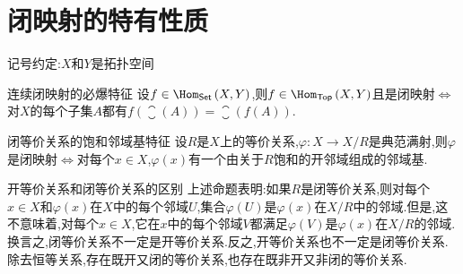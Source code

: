 \section{闭映射的特有性质}

记号约定:$X$和$Y$是拓扑空间

\begin{proposition}{连续闭映射的必爆特征}{}
	设$f\in\Hom_{\mathsf{Set}}\left(X,Y\right)$,则$f\in\Hom_{\mathsf{Top}}\left(X,Y\right)$且是闭映射$\iff$对$X$的每个子集$A$都有$f\left(\closure\left(A\right)\right)=\closure\left(f\left(A\right)\right)$.
\end{proposition}

\begin{proposition}{闭等价关系的饱和邻域基特征}{}
	设$R$是$X$上的等价关系,$\varphi:X\to X/R$是典范满射,则$\varphi$是闭映射$\iff$对每个$x\in X$,$\varphi\left(x\right)$有一个由关于$R$饱和的开邻域组成的邻域基.
\end{proposition}

\begin{remark}{开等价关系和闭等价关系的区别}{}
	上述命题表明:如果$R$是闭等价关系,则对每个$x\in X$和$\varphi\left(x\right)$在$X$中的每个邻域$U$,集合$\varphi\left(U\right)$是$\varphi\left(x\right)$在$X/R$中的邻域.但是,这不意味着,对每个$x\in X$,它在$x$中的每个邻域$V$都满足$\varphi\left(V\right)$是$\varphi\left(x\right)$在$X/R$的邻域.换言之,闭等价关系不一定是开等价关系.反之,开等价关系也不一定是闭等价关系.除去恒等关系,存在既开又闭的等价关系,也存在既非开又非闭的等价关系.
\end{remark}



